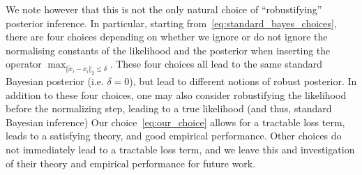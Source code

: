 We note however that this is not the only natural choice of ``robustifying'' posterior inference. 
In particular, starting from~\eqref{eq:standard_bayes_choices}, there are four choices depending on whether we ignore or do not ignore the normalising constants of the likelihood and the posterior when inserting the operator $\max_{\Vert \widetilde{x}_i - x_i \Vert_2 \leq \delta }$.
These four choices all lead to the same standard Bayesian posterior (i.e. $\delta = 0$), but lead to different notions of robust posterior.
In addition to these four choices, one may also consider robustifying the likelihood before the normalizing step, leading to a true likelihood (and thus, standard Bayesian inference)
Our choice~\eqref{eq:our_choice} allows for a tractable loss term, leads to a satisfying theory, and good empirical performance. 
Other choices do not immediately lead to a tractable loss term, and we leave this and investigation of their theory and empirical performance for future work.


\iffalse
\begin{align*}
    &=\argmin_{q' \in \Pi}\mathbb{E}_{q'(\theta \mid \mathcal{D})} \Big[ \sum_{i=1}^n  -\log p(y_i \mid x_i, \theta) \Big] + D(q' \Vert \pi ) \numberthis \label{eq:variational} \\
    &= \argmin_{q' \in \Pi}\mathbb{E}_{q'(\theta \mid \mathcal{D})} \Bigg[ \sum_{i=1}^n  -\log \frac{p(y_i \mid x_i, \theta)}{\underbrace{\int p(y_i \mid x_i, \theta) dy_i}_{=1}} \Bigg] + D(q' \Vert \pi )   
     \\
     &= \argmin_{q' \in \Pi}\mathbb{E}_{q'(\theta \mid \mathcal{D})} \Bigg[ \sum_{i=1}^n  -\log \frac{p(y_i \mid x_i, \theta)}{\underbrace{\int p(y_i \mid x_i, \theta) dy_i}_{=1}} \Bigg] + D(q' \Vert \pi )   
     +  \underbrace{\log \int \prod_{i=1}^n p(y_i \mid x_i, \theta') \pi(\theta') d\theta'}_{\text{const. w.r.t. $q'$}} \\
     &= \argmin_{q' \in \Pi}\mathbb{E}_{q'(\theta \mid \mathcal{D})} \Bigg[ \sum_{i=1}^n  -\log \frac{p(y_i \mid x_i, \theta)}{\underbrace{\int \exp\Big( - \big( -\log p(y_i \mid x_i, \theta) \big) \Big) dy_i}_{=1}} \Bigg] + D(q' \Vert \pi )   
     +  \underbrace{\log \int \prod_{i=1}^n p(y_i \mid x_i, \theta') \pi(\theta') d\theta'}_{\text{const. w.r.t. $q'$}} \\ 
     &= \argmin_{q' \in \Pi}\mathbb{E}_{q'(\theta \mid \mathcal{D})} \Bigg[ \sum_{i=1}^n  -\log p(y_i \mid x_i, \theta) + \log \int \exp\Big( - \big( -\log p(y_i \mid x_i, \theta) \big) \Big) dy_i \Bigg] + D(q' \Vert \pi )   \numberthis \label{eq:variational2} \\ 
\end{align*}
\fi

